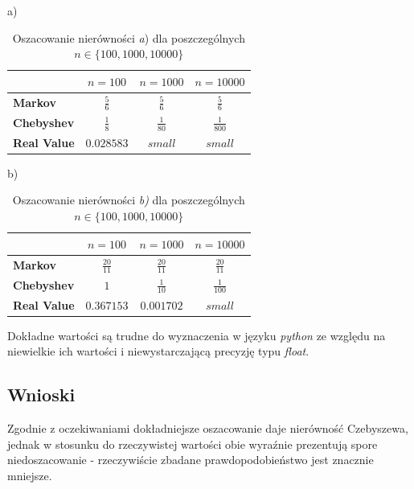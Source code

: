 \documentclass{article}
\begin{document}
\begin{table}[h]
    a)
    \centering
    \begin{tabular}{|l|c|c|c|}
        \hline
        & \textbf{$n = 100$} & \textbf{$n = 1000$} & \textbf{$n = 10000$} \\
        \hline
        \textbf{Markov}   & $\frac{5}{6}$  & $\frac{5}{6}$  & $\frac{5}{6}$  \\
        \hline
        \textbf{Chebyshev} & $\frac{1}{8}$  & $\frac{1}{80}$  & $\frac{1}{800}$  \\
        \hline
        \textbf{Real Value} & $0.028583$ & $small$ & $small$ \\
        \hline
    \end{tabular}
    \caption{Oszacowanie nierówności \textit{a}) dla poszczególnych $n\in\{100,1000,10000\}$}
    \label{tab:markov_chebyshev_a}
\end{table}

\begin{table}[h]
    b)
    \centering
    \begin{tabular}{|l|c|c|c|}
        \hline
        & \textbf{$n = 100$} & \textbf{$n = 1000$} & \textbf{$n = 10000$} \\
        \hline
        \textbf{Markov}   & $\frac{20}{11}$  & $\frac{20}{11}$  & $\frac{20}{11}$  \\
        \hline
        \textbf{Chebyshev} & $1$  & $\frac{1}{10}$  & $\frac{1}{100}$  \\
        \hline
        \textbf{Real Value} & $0.367153$ & $0.001702$ & $small$ \\
        \hline
    \end{tabular}
    \caption{Oszacowanie nierówności \textit{b)} dla poszczególnych $n\in\{100,1000,10000\}$}
    \label{tab:markov_chebyshev_b}
\end{table}

\noindent
Dokładne wartości są trudne do wyznaczenia w języku \textit{python} ze względu na niewielkie ich wartości i niewystarczającą precyzję typu \textit{float}.

\subsection{Wnioski}

Zgodnie z oczekiwaniami dokładniejsze oszacowanie daje nierówność Czebyszewa, jednak w stosunku do rzeczywistej wartości obie wyraźnie prezentują spore niedoszacowanie - rzeczywiście zbadane prawdopodobieństwo jest znacznie mniejsze.
\end{document}
